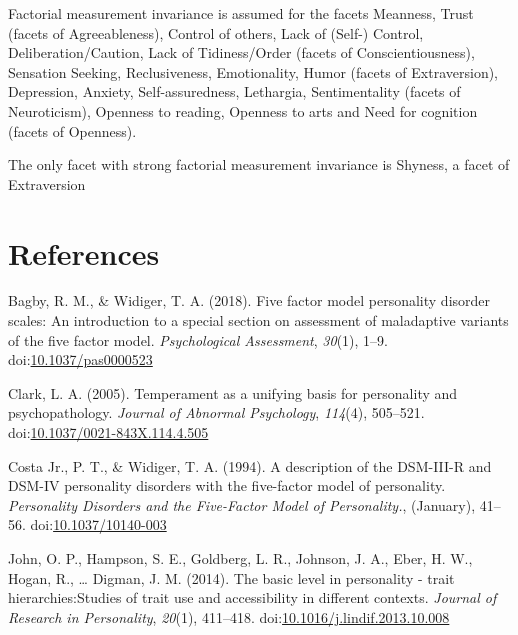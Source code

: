 \documentclass[floatsintext,man]{apa6}
\theoremstyle{definition}
\theoremstyle{definition}
\theoremstyle{definition}
\theoremstyle{remark}
\begin{document}
Factorial measurement invariance is assumed for the facets Meanness,
Trust (facets of Agreeableness), Control of others, Lack of (Self-)
Control, Deliberation/Caution, Lack of Tidiness/Order (facets of
Conscientiousness), Sensation Seeking, Reclusiveness, Emotionality,
Humor (facets of Extraversion), Depression, Anxiety, Self-assuredness,
Lethargia, Sentimentality (facets of Neuroticism), Openness to reading,
Openness to arts and Need for cognition (facets of Openness).

The only facet with strong factorial measurement invariance is Shyness,
a facet of Extraversion

\newpage

\hypertarget{references}{%
\section{References}\label{references}}

\begingroup
\setlength{\parindent}{-0.5in}
\setlength{\leftskip}{0.5in}

\hypertarget{refs}{}
\leavevmode\hypertarget{ref-Bagby2018}{}%
Bagby, R. M., \& Widiger, T. A. (2018). Five factor model personality
disorder scales: An introduction to a special section on assessment of
maladaptive variants of the five factor model. \emph{Psychological
Assessment}, \emph{30}(1), 1--9.
doi:\href{https://doi.org/10.1037/pas0000523}{10.1037/pas0000523}

\leavevmode\hypertarget{ref-Clark2005}{}%
Clark, L. A. (2005). Temperament as a unifying basis for personality and
psychopathology. \emph{Journal of Abnormal Psychology}, \emph{114}(4),
505--521.
doi:\href{https://doi.org/10.1037/0021-843X.114.4.505}{10.1037/0021-843X.114.4.505}

\leavevmode\hypertarget{ref-Widiger1994}{}%
Costa Jr., P. T., \& Widiger, T. A. (1994). A description of the
DSM-III-R and DSM-IV personality disorders with the five-factor model of
personality. \emph{Personality Disorders and the Five-Factor Model of
Personality.}, (January), 41--56.
doi:\href{https://doi.org/10.1037/10140-003}{10.1037/10140-003}

\leavevmode\hypertarget{ref-Ziegler2014}{}%
John, O. P., Hampson, S. E., Goldberg, L. R., Johnson, J. A., Eber, H.
W., Hogan, R., \ldots{} Digman, J. M. (2014). The basic level in
personality - trait hierarchies:Studies of trait use and accessibility
in different contexts. \emph{Journal of Research in Personality},
\emph{20}(1), 411--418.
doi:\href{https://doi.org/10.1016/j.lindif.2013.10.008}{10.1016/j.lindif.2013.10.008}
\end{document}
